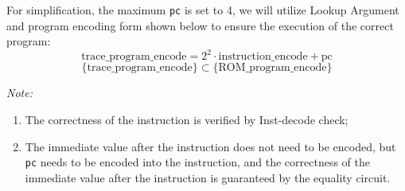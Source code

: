 For simplification, the maximum \verb|pc| is set to 4, we will utilize Lookup Argument and program encoding form shown below to ensure the execution of the correct program:
\[ \text{trace\_program\_encode} = 2^2 \cdot \text{instruction\_encode} + \text{pc} \]
\[ \{\text{trace\_program\_encode}\} \subset \{\text{ROM\_program\_encode}\} \]

\emph{Note:}
\begin{enumerate}
    \item The correctness of the instruction is verified by Inst-decode check;
    \item The immediate value after the instruction does not need to be encoded, but \verb|pc| needs to be encoded into the instruction, and the correctness of the immediate value after the instruction is guaranteed by the equality circuit.
\end{enumerate}
